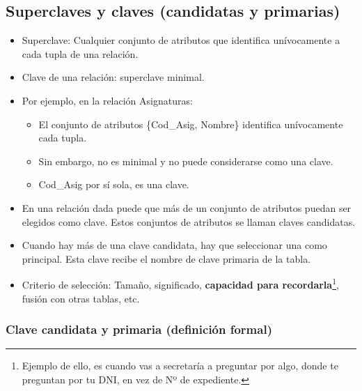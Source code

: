 \subsection*{Superclaves y claves (candidatas y primarias)}
\begin{itemize}
    \item Superclave: Cualquier conjunto de atributos que identifica unívocamente a cada tupla de una relación.
    \item Clave de una relación: superclave minimal.
    \item Por ejemplo, en la relación Asignaturas:
    \begin{itemize}
        \item El conjunto de atributos \{Cod\_Asig, Nombre\} identifica unívocamente cada tupla.
        \item Sin embargo, no es minimal y no puede considerarse como una clave.
        \item Cod\_Asig por sí sola, es una clave.
    \end{itemize}
\end{itemize}

\begin{itemize}
    \item En una relación dada puede que más de un conjunto de atributos puedan ser elegidos como clave. Estos conjuntos de atributos se llaman claves candidatas.
    \item Cuando hay más de una clave candidata, hay que seleccionar una como principal. Esta clave recibe el nombre de clave primaria de la tabla.
    \item Criterio de selección: Tamaño, significado, \textbf{capacidad para recordarla}\footnote{Ejemplo de ello, es cuando vas a secretaría a preguntar por algo, donde te preguntan por tu DNI, en vez de Nº de expediente.}, fusión con otras tablas, etc.
\end{itemize}

\subsubsection*{Clave candidata y primaria (definición formal)}

